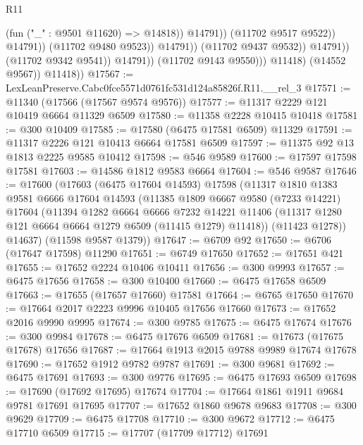 \begin{lexlean}{R11}
\begin{coremodule}
                                              (fun ("_" : @9501 @11620) => @14818))
                                            @14791))
                                        (@11702 @9517 @9522))
                                      @14791))
                                  (@11702 @9480 @9523))
                                @14791))
                            (@11702 @9437 @9532))
                          @14791))
                      (@11702 @9342 @9541))
                    @14791))
                (@11702 @9143 @9550)))
            @11418)
          (@14552 @9567))
        @11418))
@17567 := LexLeanPreserve.Cabc0fce5571d0761fc531d124a85826f.R11.__rel_3
@17571 := @11340 (@17566 (@17567 @9574 @9576))
@17577 := @11317 @2229 @121 @10419 @6664 @11329 @6509
@17580 := @11358 @2228 @10415 @10418
@17581 := @300 @10409
@17585 := @17580 (@6475 @17581 @6509) @11329
@17591 := @11317 @2226 @121 @10413 @6664 @17581 @6509
@17597 := @11375 @92 @13 @1813 @2225 @9585 @10412
@17598 := @546 @9589
@17600 := @17597 @17598 @17581
@17603 := @14586 @1812 @9583 @6664
@17604 := @546 @9587
@17646 := @17600
    (@17603
      (@6475 @17604 @14593)
      @17598
      (@11317
        @1810
        @1383
        @9581
        @6666
        @17604
        @14593
        (@11385
          @1809
          @6667
          @9580
          (@7233 @14221)
          @17604
          (@11394
            @1282
            @6664
            @6666
            @7232
            @14221
            @11406
            (@11317 @1280 @121 @6664 @6664 @1279 @6509 (@11415 @1279) @11418))
          (@11423 @1278))
        @14637)
      (@11598 @9587 @1379))
@17647 := @6709 @92
@17650 := @6706 (@17647 @17598) @11290
@17651 := @6749 @17650
@17652 := @17651 @421
@17655 := @17652 @2224 @10406 @10411
@17656 := @300 @9993
@17657 := @6475 @17656
@17658 := @300 @10400
@17660 := @6475 @17658 @6509
@17663 := @17655 (@17657 @17660) @17581
@17664 := @6765 @17650
@17670 := @17664 @2017 @2223 @9996 @10405 @17656 @17660
@17673 := @17652 @2016 @9990 @9995
@17674 := @300 @9785
@17675 := @6475 @17674
@17676 := @300 @9984
@17678 := @6475 @17676 @6509
@17681 := @17673 (@17675 @17678) @17656
@17687 := @17664 @1913 @2015 @9788 @9989 @17674 @17678
@17690 := @17652 @1912 @9782 @9787
@17691 := @300 @9681
@17692 := @6475 @17691
@17693 := @300 @9776
@17695 := @6475 @17693 @6509
@17698 := @17690 (@17692 @17695) @17674
@17704 := @17664 @1861 @1911 @9684 @9781 @17691 @17695
@17707 := @17652 @1860 @9678 @9683
@17708 := @300 @9629
@17709 := @6475 @17708
@17710 := @300 @9672
@17712 := @6475 @17710 @6509
@17715 := @17707 (@17709 @17712) @17691

\end{coremodule}
\end{lexlean}
